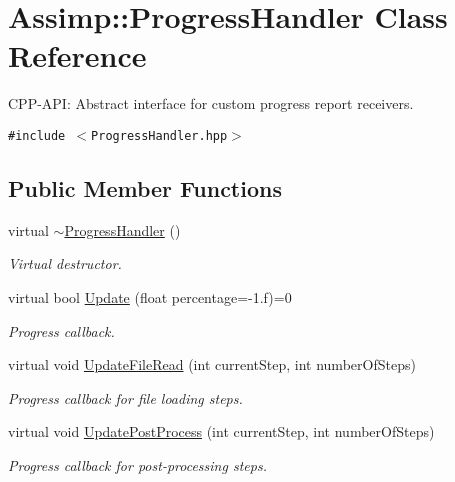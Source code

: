 \hypertarget{class_assimp_1_1_progress_handler}{
\section{Assimp::ProgressHandler Class Reference}
\label{class_assimp_1_1_progress_handler}
}
CPP-API: Abstract interface for custom progress report receivers.  


{\tt \#include $<$ProgressHandler.hpp$>$}

\subsection*{Public Member Functions}
\begin{CompactItemize}
\item 
\hypertarget{class_assimp_1_1_progress_handler_3ec465a62e1feaae00f585ca0cffb81e}{
virtual \hyperlink{class_assimp_1_1_progress_handler_3ec465a62e1feaae00f585ca0cffb81e}{$\sim$ProgressHandler} ()}
\label{class_assimp_1_1_progress_handler_3ec465a62e1feaae00f585ca0cffb81e}

\begin{CompactList}\small\item\em Virtual destructor. \item\end{CompactList}\item 
virtual bool \hyperlink{class_assimp_1_1_progress_handler_b08a1d300d434f6dd86ca41747cba448}{Update} (float percentage=-1.f)=0
\begin{CompactList}\small\item\em Progress callback. \item\end{CompactList}\item 
virtual void \hyperlink{class_assimp_1_1_progress_handler_0c867692ee9d1e25dec1e2f08fb5e20d}{UpdateFileRead} (int currentStep, int numberOfSteps)
\begin{CompactList}\small\item\em Progress callback for file loading steps. \item\end{CompactList}\item 
virtual void \hyperlink{class_assimp_1_1_progress_handler_57b30d2a9b2ae1f932918f18c30196ed}{UpdatePostProcess} (int currentStep, int numberOfSteps)
\begin{CompactList}\small\item\em Progress callback for post-processing steps. \item\end{CompactList}\end{CompactItemize}
